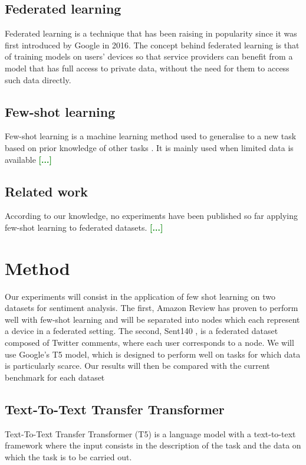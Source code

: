 \documentclass{esannV2}
\begin{document}
\subsection{Federated learning}
Federated learning is a technique that has been raising in popularity since it was first introduced by Google in 2016. The concept behind federated learning is that of training models on users' devices so that service providers can benefit from a model that has full access to private data, without the need for them to access such data directly.

\subsection{Few-shot learning}
Few-shot learning is a machine learning method used to generalise to a new task based on prior knowledge of other tasks \cite{wang2020generalizing}. It is mainly used when limited data is available \textcolor{green}{\textbf{[...]}}

\subsection{Related work}
According to our knowledge, no experiments have been published so far applying few-shot learning to federated datasets. 
\textcolor{green}{\textbf{[...]}}

\section{Method}
Our experiments will consist in the application of few shot learning on two datasets for sentiment analysis. The first, Amazon Review \cite{keung2020multilingual} has proven to perform well with few-shot learning and will be separated into nodes which each represent a device in a federated setting. The second, Sent140 \cite{caldas2019leaf}, is a federated dataset composed of Twitter comments, where each user corresponds to a node. We will use Google's T5 model, which is designed to perform well on tasks for which data is particularly scarce. Our results will then be compared with the current benchmark for each dataset \textcolor{green}{\textbf{\cite{Bench1}}} \textcolor{green}{\textbf{\cite{Bench2}}}
 
\subsection{Text-To-Text Transfer Transformer}
Text-To-Text Transfer Transformer (T5) \cite{t5} is a language model with a text-to-text framework where the input consists in the description of the task and the data on which the task is to be carried out.
\end{document}

